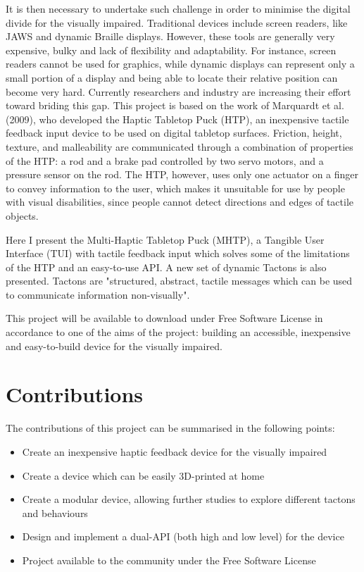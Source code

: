 It is then necessary to undertake such challenge in order to minimise the digital divide for the visually impaired. Traditional devices include screen readers, like JAWS\cite{JAWS} and dynamic Braille displays\cite{HumanWare, shimada2010development, blindMaps}. However, these tools are generally very expensive, bulky and lack of flexibility and adaptability. For instance, screen readers cannot be used for graphics, while dynamic displays can represent only a small portion of a display and being able to locate their relative position can become very hard.
Currently researchers and industry are increasing their effort toward briding this gap. This project is based on the work of Marquardt et al.(2009)\nocite{marquardt2009haptic}, who developed the Haptic Tabletop Puck (HTP), an inexpensive tactile feedback input device to be used on digital tabletop surfaces. Friction, height, texture, and malleability are communicated through a combination of properties of the HTP: a rod and a brake pad controlled by two servo motors, and a pressure sensor on the rod. The HTP, however, uses only one actuator on a finger to convey information to the user, which makes it unsuitable for use by people with visual disabilities, since people cannot detect directions and edges of tactile objects. \par

Here I present the Multi-Haptic Tabletop Puck (MHTP), a Tangible User Interface (TUI)\cite{ishii1997tangible} with tactile feedback input which solves some of the limitations of the HTP and an easy-to-use API. A new set of dynamic Tactons is also presented. Tactons are "structured, abstract, tactile messages which can be used to communicate information non-visually"\cite{brown2005first}.\par
This project will be available to download under Free Software License in accordance to one of the aims of the project: building an accessible, inexpensive and easy-to-build device for the visually impaired. \par

\section{Contributions}

The contributions of this project can be summarised in the following points:
\begin{itemize}
	\item Create an inexpensive haptic feedback device for the visually impaired
    \item Create a device which can be easily 3D-printed at home
    \item Create a modular device, allowing further studies to explore different tactons and behaviours
    \item Design and implement a dual-API (both high and low level) for the device
    \item Project available to the community under the Free Software License 
\end{itemize}


